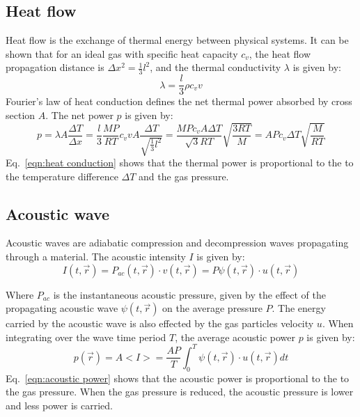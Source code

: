 \documentclass[\main/master.tex]{subfiles}
\begin{document}
\subsection{Heat flow}
Heat flow is the exchange of thermal energy between physical systems. It can be shown that for an ideal gas with specific heat capacity $c_v$, the heat flow propagation distance is $\Delta x ^2  = \frac{1}{3} l^2 $, and the thermal conductivity $\lambda$ is given by:
\begin{equation}
\lambda  = \frac{l}{3}\rho c_v v    \label{eqn:heat conduction coefficient}
\end{equation}
Fourier's law of heat conduction defines the net thermal power absorbed by cross section $A$. The net power $p$ is given by:
\begin{equation}
p =  \lambda A \frac{\Delta T}{\Delta x} =\frac{l}{3} \frac{MP}{RT} c_v v A \frac{\Delta T}{\sqrt{\frac{1}{3} l^2 }} = \frac{M P c_v  A \Delta T}{\sqrt{3}RT} \sqrt{\frac{3RT}{M}} =    A P c_v \Delta T \sqrt{\frac{M}{RT}} 
\label{eqn:heat conduction}
\end{equation}
Eq.~\ref{eqn:heat conduction} shows that the thermal power is proportional to the to the temperature difference $\Delta T$ and the gas pressure.


\subsection{Acoustic wave}
Acoustic waves are adiabatic compression and decompression waves propagating through a material. The acoustic intensity $I$ is given by:
\begin{equation}
I( t,\vec{r}) = P_{ac}( t,\vec{r})\cdot v( t,\vec{r}) = P \psi( t,\vec{r}) \cdot u( t,\vec{r})      \label{eqn:acoustic_pressure}
\end{equation}
\par\noindent
Where $P_{ac}$ is the instantaneous acoustic pressure, given by the effect of the propagating acoustic wave $\psi( t,\vec{r})$ on the average pressure $P$. The energy carried by the acoustic wave is also effected by the gas particles velocity $u$. When integrating over the wave time period $T$, the average acoustic power $p$ is given by:
\begin{equation}
p(\vec{r}) =  A <I>=\frac{AP}{T}\int_0^T \psi( t,\vec{r}) \cdot u( t,\vec{r})dt  
\label{eqn:acoustic power}
\end{equation}
Eq.~\ref{eqn:acoustic power} shows that the acoustic power is proportional to the to the gas pressure. When the gas pressure is reduced, the acoustic pressure is lower and less power is carried.
\end{document}
